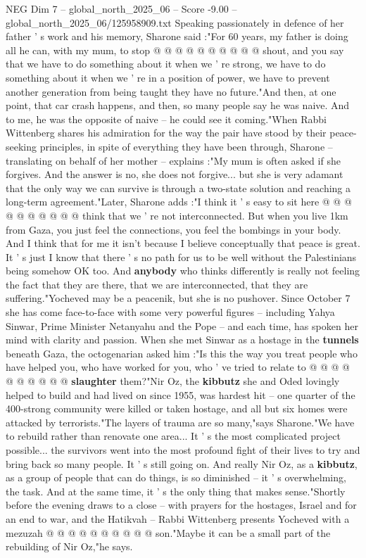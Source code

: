 \begin{textsample}{NEG Dim 7 – global\_north\_2025\_06 – Score -9.00 – global\_north\_2025\_06/125958909.txt}
Speaking passionately in defence of her father ' s work and his memory, Sharone said :"For 60 years, my father is doing all he can, with my mum, to stop @ @ @ @ @ @ @ @ @ @ shout, and you say that we have to do something about it when we ' re strong, we have to do something about it when we ' re in a position of power, we have to prevent another generation from being taught they have no future."And then, at one point, that car crash happens, and then, so many people say he was naive.
And to me, he was the opposite of naive -- he could see it coming."When Rabbi Wittenberg shares his admiration for the way the pair have stood by their peace-seeking principles, in spite of everything they have been through, Sharone -- translating on behalf of her mother -- explains :"My mum is often asked if she forgives.
And the answer is no, she does not forgive... but she is very adamant that the only way we can survive is through a two-state solution and reaching a long-term agreement."Later, Sharone adds :"I think it ' s easy to sit here @ @ @ @ @ @ @ @ @ @ think that we ' re not interconnected.
But when you live 1km from Gaza, you just feel the connections, you feel the bombings in your body.
And I think that for me it isn't because I believe conceptually that peace is great.
It ' s just I know that there ' s no path for us to be well without the Palestinians being somehow OK too.
And \textbf{anybody} who thinks differently is really not feeling the fact that they are there, that we are interconnected, that they are suffering."Yocheved may be a peacenik, but she is no pushover.
Since October 7 she has come face-to-face with some very powerful figures -- including Yahya Sinwar, Prime Minister Netanyahu and the Pope -- and each time, has spoken her mind with clarity and passion.
When she met Sinwar as a hostage in the \textbf{tunnels} beneath Gaza, the octogenarian asked him :"Is this the way you treat people who have helped you, who have worked for you, who ' ve tried to relate to @ @ @ @ @ @ @ @ @ @ \textbf{slaughter} them?"Nir Oz, the \textbf{kibbutz} she and Oded lovingly helped to build and had lived on since 1955, was hardest hit -- one quarter of the 400-strong community were killed or taken hostage, and all but six homes were attacked by terrorists."The layers of trauma are so many,"says Sharone."We have to rebuild rather than renovate one area...
It ' s the most complicated project possible... the survivors went into the most profound fight of their lives to try and bring back so many people.
It ' s still going on.
And really Nir Oz, as a \textbf{kibbutz}, as a group of people that can do things, is so diminished -- it ' s overwhelming, the task.
And at the same time, it ' s the only thing that makes sense."Shortly before the evening draws to a close -- with prayers for the hostages, Israel and for an end to war, and the Hatikvah -- Rabbi Wittenberg presents Yocheved with a mezuzah @ @ @ @ @ @ @ @ @ @ son."Maybe it can be a small part of the rebuilding of Nir Oz,"he says.

\end{textsample}
